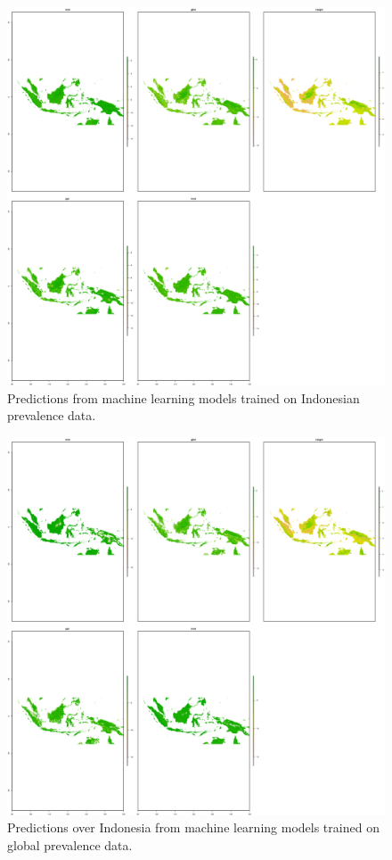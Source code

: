 \documentclass[review]{elsarticle}
\begin{document}
\begin{figure}[h!]
  \centering
  \includegraphics[width=1\textwidth]{figs/SI/idn_all_ml.png}
\caption{
  Predictions from machine learning models trained on Indonesian prevalence data.
}

\end{figure}


\begin{figure}[h!]
  \centering
  \includegraphics[width=1\textwidth]{figs/SI/idn_all_globalml.png}
\caption{
  Predictions over Indonesia from machine learning models trained on global prevalence data.
}

\end{figure}
\end{document}
